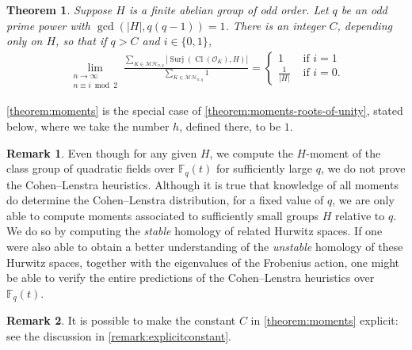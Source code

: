 \documentclass[12 pt]{amsart}
\theoremstyle{plain}
\newtheorem{theorem}[subsubsection]{Theorem}
\theoremstyle{definition}
\newtheorem{remark}[theorem]{Remark}
\theoremstyle{remark}
\numberwithin{equation}{section}
\DeclareMathOperator\cl{Cl}
\DeclareMathOperator\surj{Surj}
\begin{document}
\begin{theorem}
	\label{theorem:moments}
	Suppose $H$ is a finite abelian group of odd order.
	Let $q$ be an odd prime power with
	$\gcd( |H|, q(q-1)) = 1$.
	There is an integer $C$, depending only on $H$, so that
	if $q > C$ and $i \in \{0,1\}$,
	\begin{align}
		\label{equation:moments}
		\lim_{\substack{n \to \infty \\ n \equiv i \bmod 2 }}
		\frac{\sum_{K \in \mathcal{MH}_{n,q}}
	\left|\surj(\cl(\mathscr O_K), H) \right|} {\sum_{K \in \mathcal{MH}_{n,q}} 1} =
	\begin{cases}
		1 & \text{ if } i =1 \\
		\frac{1}{|H|} & \text{ if } i = 0.
	\end{cases}
	\end{align}
\end{theorem}

\autoref{theorem:moments} is the special case of
\autoref{theorem:moments-roots-of-unity}, stated below, where we take the number
$h$, defined there, to be $1$.

\begin{remark}
\label{remark:}
Even though for any given $H$, we compute the $H$-moment of the class group of
quadratic fields over $\mathbb F_q(t)$ for sufficiently large $q$, we
do not prove the Cohen--Lenstra heuristics. Although it is true that knowledge of
all moments do determine the Cohen--Lenstra distribution, for a fixed value of
$q$, we are only able to
compute moments associated to sufficiently small groups $H$ relative to $q$.
We do so by computing the {\em stable} homology of related Hurwitz spaces.
If one were also able to obtain a better understanding of the
{\em unstable} homology of these Hurwitz spaces, together with the eigenvalues
of the Frobenius
action,
one might be able to
verify the entire predictions of the Cohen--Lenstra heuristics over $\mathbb
F_q(t)$.
\end{remark}

\begin{remark}
	It is possible to make the constant $C$ in \autoref{theorem:moments}
	explicit: see the discussion in \autoref{remark:explicitconstant}.
\end{remark}
\end{document}
